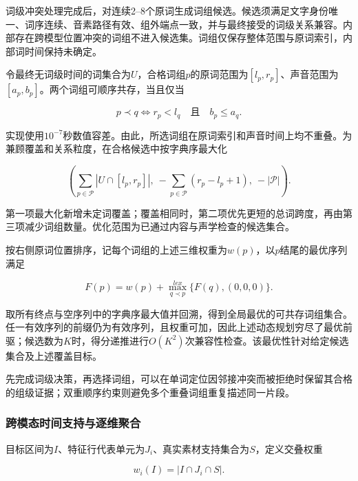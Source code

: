 词级冲突处理完成后，对连续2--8个原词生成词组候选。候选须满足文字身份唯一、词序连续、音素路径有效、组外端点一致，并与最终接受的词级关系兼容。内部存在跨模型位置冲突的词组不进入候选集。词组仅保存整体范围与原词索引，内部词时间保持未确定。

令最终无词级时间的词集合为\(U\)，合格词组\(p\)的原词范围为\([l_p,r_p]\)、声音范围为\([a_p,b_p]\)。两个词组可顺序共存，当且仅当

\begin{equation}p\prec q\iff r_p<l_q\quad\text{且}\quad b_p\le a_q.\end{equation}

实现使用\(10^{-7}\)秒数值容差。由此，所选词组在原词索引和声音时间上均不重叠。为兼顾覆盖和关系粒度，在合格候选中按字典序最大化

\begin{equation}\left(\sum_{p\in\mathcal P}|U\cap[l_p,r_p]|,\ -\sum_{p\in\mathcal P}(r_p-l_p+1),\ -|\mathcal P|\right).\end{equation}

第一项最大化新增未定词覆盖；覆盖相同时，第二项优先更短的总词跨度，再由第三项减少词组数量。优化范围为已通过内容与声学检查的候选集合。

按右侧原词位置排序，记每个词组的上述三维权重为\(w(p)\)，以\(p\)结尾的最优序列满足

\begin{equation}F(p)=w(p)+\max_{q\prec p}^{lex}\{F(q),(0,0,0)\}.\end{equation}

取所有终点与空序列中的字典序最大值并回溯，得到全局最优的可共存词组集合。任一有效序列的前缀仍为有效序列，且权重可加，因此上述动态规划穷尽了最优前驱；候选数为\(K\)时，得分递推进行\(O(K^2)\)次兼容性检查。该最优性针对给定候选集合及上述覆盖目标。

先完成词级决策，再选择词组，可以在单词定位因邻接冲突而被拒绝时保留其合格的组级证据；双重顺序约束则避免多个重叠词组重复描述同一片段。

\hypertarget{q1-ux8de8ux6a21ux6001ux65f6ux95f4ux652fux6301ux4e0eux9010ux7ef4ux805aux5408}{%
\subsubsection{跨模态时间支持与逐维聚合}\label{q1-ux8de8ux6a21ux6001ux65f6ux95f4ux652fux6301ux4e0eux9010ux7ef4ux805aux5408}}

目标区间为\(I\)、特征行代表单元为\(J_i\)、真实素材支持集合为\(S\)，定义交叠权重

\begin{equation}w_i(I)=|I\cap J_i\cap S|.\end{equation}

